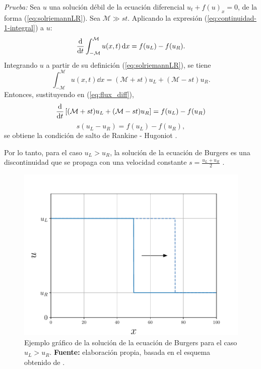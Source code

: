 \textit{Prueba:} Sea $u$ una solución débil de la ecuación diferencial $u_t + f(u)_x = 0$, de la forma (\ref{eq:solriemannLR}). Sea $\mathcal{M} \gg st$. Aplicando la expresión (\ref{eq:continuidad-1-integral}) a $u$:
\begin{equation}
	\dv{t} \int_{-\mathcal{M}}^{\mathcal{M}}u(x,t)\dd{x} = f(u_L) - f(u_R).
	\label{eq:flux_diff}
\end{equation}
Integrando $u$ a partir de su definición (\ref{eq:solriemannLR}), se tiene
\begin{equation}
	\int_{-\mathcal{M}}^{\mathcal{M}}u(x,t)\dd{x} = (\mathcal{M} + st)u_L + (\mathcal{M} - st)u_R.
\end{equation}
Entonces, sustituyendo en (\ref{eq:flux_diff}),
\begin{equation}
	\dv{t}\left[(\mathcal{M} + st)u_L + (\mathcal{M} - st)u_R\right] = f(u_L) - f(u_R)
\end{equation}
\begin{equation}
	s(u_L - u_R) = f(u_L) - f(u_R),
\end{equation}
se obtiene la condición de salto de Rankine - Hugoniot \cite{Leveque}.

Por lo tanto, para el caso $u_L > u_R$, la solución de la ecuación de Burgers es una discontinuidad que se propaga con una velocidad constante $s = \frac{u_L + u_R}{2}$ \cite{Cameron}.

\begin{figure}[ht]
	\centering
	\includegraphics[width=0.8\linewidth]{../some_plots/cap1/graficas/riemannLR.pdf}
	\caption{Ejemplo gráfico de la solución de la ecuación de Burgers para el caso $u_L > u_R$. \textbf{Fuente: }elaboración propia, basada en el esquema obtenido de \cite{Leveque}.}
	\label{fig:solriemannLR}
\end{figure}

